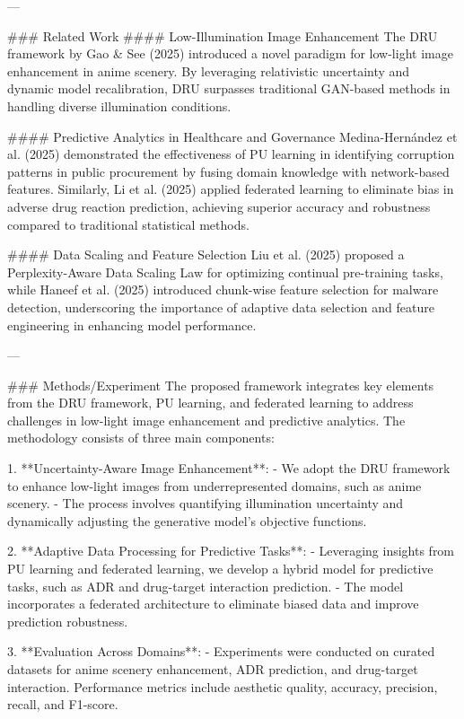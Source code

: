 ---

### Related Work
#### Low-Illumination Image Enhancement
The DRU framework by Gao & See (2025) introduced a novel paradigm for low-light image enhancement in anime scenery. By leveraging relativistic uncertainty and dynamic model recalibration, DRU surpasses traditional GAN-based methods in handling diverse illumination conditions.

#### Predictive Analytics in Healthcare and Governance
Medina-Hernández et al. (2025) demonstrated the effectiveness of PU learning in identifying corruption patterns in public procurement by fusing domain knowledge with network-based features. Similarly, Li et al. (2025) applied federated learning to eliminate bias in adverse drug reaction prediction, achieving superior accuracy and robustness compared to traditional statistical methods.

#### Data Scaling and Feature Selection
Liu et al. (2025) proposed a Perplexity-Aware Data Scaling Law for optimizing continual pre-training tasks, while Haneef et al. (2025) introduced chunk-wise feature selection for malware detection, underscoring the importance of adaptive data selection and feature engineering in enhancing model performance.

---

### Methods/Experiment
The proposed framework integrates key elements from the DRU framework, PU learning, and federated learning to address challenges in low-light image enhancement and predictive analytics. The methodology consists of three main components:

1. **Uncertainty-Aware Image Enhancement**:
   - We adopt the DRU framework to enhance low-light images from underrepresented domains, such as anime scenery.
   - The process involves quantifying illumination uncertainty and dynamically adjusting the generative model's objective functions.

2. **Adaptive Data Processing for Predictive Tasks**:
   - Leveraging insights from PU learning and federated learning, we develop a hybrid model for predictive tasks, such as ADR and drug-target interaction prediction.
   - The model incorporates a federated architecture to eliminate biased data and improve prediction robustness.

3. **Evaluation Across Domains**:
   - Experiments were conducted on curated datasets for anime scenery enhancement, ADR prediction, and drug-target interaction. Performance metrics include aesthetic quality, accuracy, precision, recall, and F1-score.

